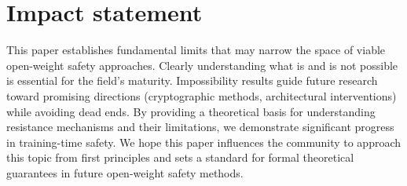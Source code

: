 \documentclass{article}
\theoremstyle{plain}
\theoremstyle{definition}
\theoremstyle{remark}
\begin{document}


\section*{Impact statement}

This paper establishes fundamental limits that may narrow the space of viable open-weight safety approaches. Clearly understanding what is and is not possible is essential for the field's maturity. Impossibility results guide future research toward promising directions (cryptographic methods, architectural interventions) while avoiding dead ends. By providing a theoretical basis for understanding resistance mechanisms and their limitations, we demonstrate significant progress in training-time safety. We hope this paper influences the community to approach this topic from first principles and sets a standard for formal theoretical guarantees in future open-weight safety methods.




\newpage
\appendix
\onecolumn
\end{document}
